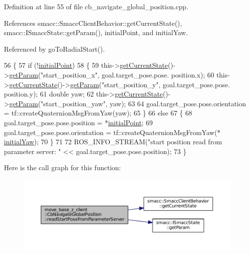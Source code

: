 Definition at line 55 of file cb\+\_\+navigate\+\_\+global\+\_\+position.\+cpp.



References smacc\+::\+Smacc\+Client\+Behavior\+::get\+Current\+State(), smacc\+::\+I\+Smacc\+State\+::get\+Param(), initial\+Point, and initial\+Yaw.



Referenced by go\+To\+Radial\+Start().


\begin{DoxyCode}
56 \{
57     \textcolor{keywordflow}{if} (!\hyperlink{classmove__base__z__client_1_1CbNavigateGlobalPosition_a603d293ad4557e8332fcfd264d7075d4}{initialPoint})
58     \{
59         this->\hyperlink{classsmacc_1_1SmaccClientBehavior_abf6773e4dd948f932f11a346dd6e7c2c}{getCurrentState}()->\hyperlink{classsmacc_1_1ISmaccState_abbb3a24b912c6e8de28f7b86123b6357}{getParam}(\textcolor{stringliteral}{"start\_position\_x"}, goal.target\_pose.pose.
      position.x);
60         this->\hyperlink{classsmacc_1_1SmaccClientBehavior_abf6773e4dd948f932f11a346dd6e7c2c}{getCurrentState}()->\hyperlink{classsmacc_1_1ISmaccState_abbb3a24b912c6e8de28f7b86123b6357}{getParam}(\textcolor{stringliteral}{"start\_position\_y"}, goal.target\_pose.pose.
      position.y);
61         \textcolor{keywordtype}{double} yaw;
62         this->\hyperlink{classsmacc_1_1SmaccClientBehavior_abf6773e4dd948f932f11a346dd6e7c2c}{getCurrentState}()->\hyperlink{classsmacc_1_1ISmaccState_abbb3a24b912c6e8de28f7b86123b6357}{getParam}(\textcolor{stringliteral}{"start\_position\_yaw"}, yaw);
63 
64         goal.target\_pose.pose.orientation = tf::createQuaternionMsgFromYaw(yaw);
65     \}
66     \textcolor{keywordflow}{else}
67     \{
68         goal.target\_pose.pose.position = *\hyperlink{classmove__base__z__client_1_1CbNavigateGlobalPosition_a603d293ad4557e8332fcfd264d7075d4}{initialPoint};
69         goal.target\_pose.pose.orientation = tf::createQuaternionMsgFromYaw(*
      \hyperlink{classmove__base__z__client_1_1CbNavigateGlobalPosition_a339ec9b992e2565f404d8a2fa8a5be87}{initialYaw});
70     \}
71 
72     ROS\_INFO\_STREAM(\textcolor{stringliteral}{"start position read from parameter server: "} << goal.target\_pose.pose.position);
73 \}
\end{DoxyCode}


Here is the call graph for this function\+:
\nopagebreak
\begin{figure}[H]
\begin{center}
\leavevmode
\includegraphics[width=350pt]{classmove__base__z__client_1_1CbNavigateGlobalPosition_a866ea02c9e25ac1df9df88272deb04b3_cgraph}
\end{center}
\end{figure}




